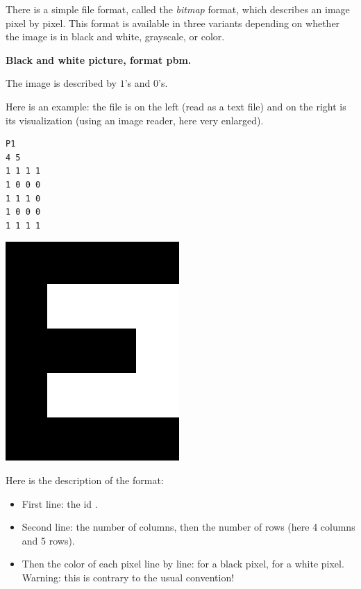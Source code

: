 \documentclass[11pt,class=report,crop=false]{standalone}
\begin{document}
\begin{cours}


There is a simple file format, called the \emph{bitmap} format, which describes an image pixel by pixel. This format is available in three variants 
depending on whether the image is in black and white, grayscale, or color.

\medskip

\textbf{Black and white picture, format \og{}pbm\fg{}.}

The image is described by $1$'s and $0$'s.

Here is an example: the file  is on the left (read as a text file) and on the right is its visualization (using an image reader, here very enlarged).
\begin{center}
\begin{minipage}{0.3\textwidth}
\begin{lstlisting}
P1
4 5
1 1 1 1
1 0 0 0
1 1 1 0
1 0 0 0
1 1 1 1
\end{lstlisting}
\end{minipage}
\begin{minipage}{0.3\textwidth}
\includegraphics[scale=\myscale,scale=0.2]{screen-lesson-image_nb}
\end{minipage}
\end{center}

Here is the description of the format:
\begin{itemize}
  \item First line: the id .
  \item Second line: the number of columns, then the number of rows (here 4 columns and 5 rows).
  \item Then the color of each pixel line by line:  for a black pixel,  for a white pixel. Warning: this is contrary to the usual convention!
\end{itemize}  
  

\end{cours}
\end{document}

